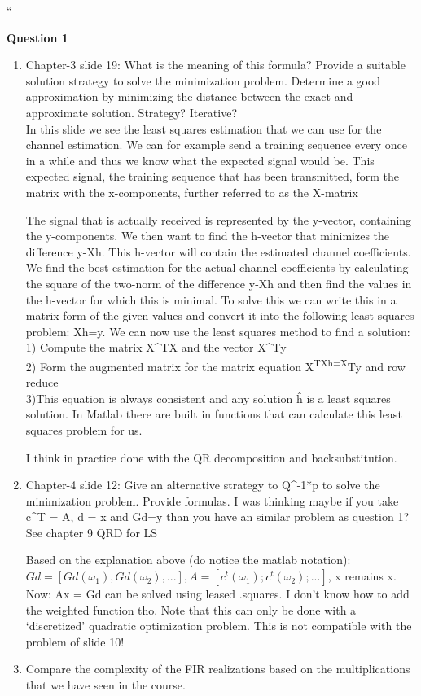 \documentclass[
  a4paper,
  ,captions=tableheading
]{scrartcl}
\begin{document}
``

\textbf{Question 1}

\begin{enumerate}
\def\labelenumi{\arabic{enumi}.}
\item
  Chapter-3 slide 19: What is the meaning of this formula? Provide a
  suitable solution strategy to solve the minimization problem.
  Determine a good approximation by minimizing the distance between the
  exact and approximate solution. Strategy? Iterative?\\
  In this slide we see the least squares estimation that we can use for
  the channel estimation. We can for example send a training sequence
  every once in a while and thus we know what the expected signal would
  be. This expected signal, the training sequence that has been
  transmitted, form the matrix with the x-components, further referred
  to as the X-matrix

  The signal that is actually received is represented by the y-vector,
  containing the y-components. We then want to find the h-vector that
  minimizes the difference y-Xh. This h-vector will contain the
  estimated channel coefficients. We find the best estimation for the
  actual channel coefficients by calculating the square of the two-norm
  of the difference y-Xh and then find the values in the h-vector for
  which this is minimal. To solve this we can write this in a matrix
  form of the given values and convert it into the following least
  squares problem: Xh=y. We can now use the least squares method to find
  a solution:\\
  1) Compute the matrix X\^{}TX and the vector X\^{}Ty\\
  2) Form the augmented matrix for the matrix equation
  X\textsuperscript{TXh=X}Ty and row reduce\\
  3)This equation is always consistent and any solution ĥ is a least
  squares solution. In Matlab there are built in functions that can
  calculate this least squares problem for us.

  I think in practice done with the QR decomposition and
  backsubstitution.
\item
  Chapter-4 slide 12: Give an alternative strategy to Q\^{}-1*p to solve
  the minimization problem. Provide formulas. I was thinking maybe if
  you take c\^{}T = A, d = x and Gd=y than you have an similar problem
  as question 1? See chapter 9 QRD for LS

  Based on the explanation above (do notice the matlab notation):
  \(Gd = [Gd(\omega_1), Gd(\omega_2), ...], A = [c^t(\omega_1); c^t(\omega_2); ...]\),
  x remains x. Now: Ax = Gd can be solved using leased .squares. I don't
  know how to add the weighted function tho. Note that this can only be
  done with a `discretized' quadratic optimization problem. This is not
  compatible with the problem of slide 10!
\item
  Compare the complexity of the FIR realizations based on the
  multiplications that we have seen in the course.


\end{enumerate}
\end{document}
